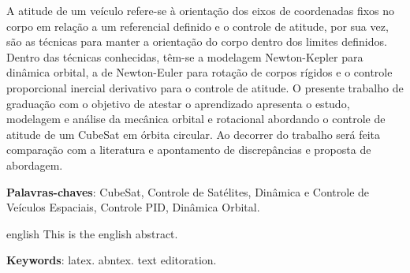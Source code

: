 
\setlength{\absparsep}{18pt} %
\begin{resumo}
A atitude de um veículo refere-se à orientação dos eixos de coordenadas fixos no corpo em relação a um referencial definido e o controle de atitude, por sua vez, são as técnicas para manter a orientação do corpo dentro dos limites definidos. Dentro das técnicas conhecidas, têm-se a modelagem Newton-Kepler para dinâmica orbital, a de Newton-Euler para rotação de corpos rígidos e o controle proporcional inercial derivativo para o controle de atitude. O presente trabalho de graduação com o objetivo de atestar o aprendizado apresenta o estudo, modelagem e análise da mecânica orbital e rotacional abordando o controle de atitude de um CubeSat em órbita circular. Ao decorrer do trabalho será feita comparação com a literatura e apontamento de discrepâncias e proposta de abordagem.

 \textbf{Palavras-chaves}: CubeSat, Controle de Satélites, Dinâmica e Controle de Veículos Espaciais, Controle PID, Dinâmica Orbital.
\end{resumo}

\begin{resumo}[Abstract]
 \begin{otherlanguage*}{english}
   This is the english abstract.

   \vspace{\onelineskip}
 
   \noindent 
   \textbf{Keywords}: latex. abntex. text editoration.
 \end{otherlanguage*}
\end{resumo}